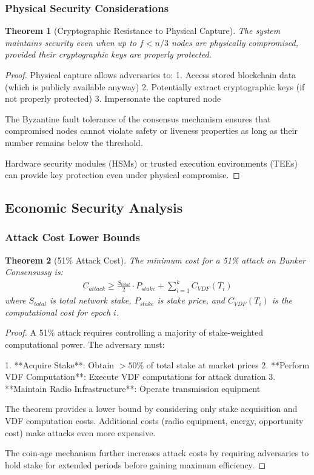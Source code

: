 \documentclass[11pt,a4paper]{article}
\newtheorem{theorem}{Theorem}[section]
\begin{document}
\subsubsection{Physical Security Considerations}

\begin{theorem}[Cryptographic Resistance to Physical Capture]
The system maintains security even when up to $f < n/3$ nodes are physically compromised, provided their cryptographic keys are properly protected.
\end{theorem}

\begin{proof}
Physical capture allows adversaries to:
1. Access stored blockchain data (which is publicly available anyway)
2. Potentially extract cryptographic keys (if not properly protected)
3. Impersonate the captured node

The Byzantine fault tolerance of the consensus mechanism ensures that compromised nodes cannot violate safety or liveness properties as long as their number remains below the threshold.

Hardware security modules (HSMs) or trusted execution environments (TEEs) can provide key protection even under physical compromise.
\end{proof}

\subsection{Economic Security Analysis}

\subsubsection{Attack Cost Lower Bounds}

\begin{theorem}[51\% Attack Cost]
The minimum cost for a 51\% attack on Bunker Consensussy is:
\begin{align}
C_{attack} \geq \frac{S_{total}}{2} \cdot P_{stake} + \sum_{i=1}^{k} C_{VDF}(T_i)
\end{align}
where $S_{total}$ is total network stake, $P_{stake}$ is stake price, and $C_{VDF}(T_i)$ is the computational cost for epoch $i$.
\end{theorem}

\begin{proof}
A 51\% attack requires controlling a majority of stake-weighted computational power. The adversary must:

1. **Acquire Stake**: Obtain $> 50\%$ of total stake at market prices
2. **Perform VDF Computation**: Execute VDF computations for attack duration
3. **Maintain Radio Infrastructure**: Operate transmission equipment

The theorem provides a lower bound by considering only stake acquisition and VDF computation costs. Additional costs (radio equipment, energy, opportunity cost) make attacks even more expensive.

The coin-age mechanism further increases attack costs by requiring adversaries to hold stake for extended periods before gaining maximum efficiency.
\end{proof}
\end{document}
